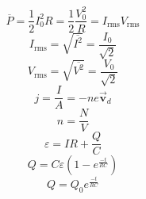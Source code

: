 \documentclass[12pt,landscape]{article}
\begin{document}
\begin{multicols}{4}
    \begin{equation*}
        \overbar{P} = \frac{1}{2} I_0^2 R = \frac{1}{2} \frac{V_0^2}{R}= I_{\text{rms}} V_{\text{rms}}
    \end{equation*}
    \begin{equation*}
        I_{\text{rms}} = \sqrt{\overbar{I^2}} = \frac{I_0}{\sqrt{2}}
    \end{equation*}
    \begin{equation*}
        V_{\text{rms}} = \sqrt{\overbar{V^2}} = \frac{V_0}{\sqrt{2}}
    \end{equation*}
    \begin{equation*}
        j = \frac{I}{A} = -n e \vec{\mathbf{v}}_d
    \end{equation*}
    \begin{equation*}
        n = \frac{N}{V}
    \end{equation*}
    \begin{equation*}
        \varepsilon = IR + \frac{Q}{C}
    \end{equation*}
    \begin{equation*}
        Q = C\varepsilon \left(1 - e^{\frac{-t}{RC}} \right)
    \end{equation*}
    \begin{equation*}
        Q = Q_0 e^{\frac{-t}{RC}}
    \end{equation*}


\end{multicols}
\end{document}
